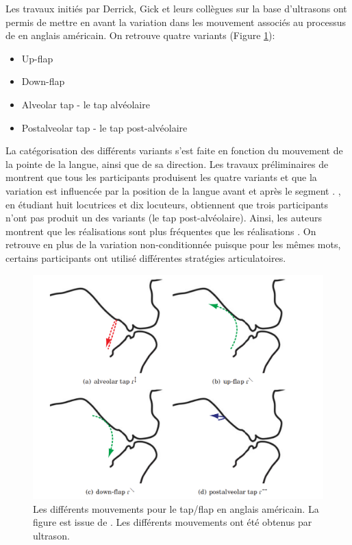 Les travaux initiés par Derrick, Gick et leurs collègues \parencite{derrickQuantitativeAnalysisSubphonemic2008,derrickTwoPhonologicalSegments2010,derrickIndividualVariationEnglish2011,derrickAcousticCorrelatesFlaps2013} sur la base d'ultrasons ont permis de mettre en avant la variation dans les mouvement associés au processus de  en anglais américain. On retrouve quatre variants (Figure \ref{fig:tapflap}):

\begin{itemize}
	\item Up-flap
	\item Down-flap
	\item Alveolar tap - le tap alvéolaire
	\item Postalveolar tap - le tap post-alvéolaire
\end{itemize} 

La catégorisation des différents variants s'est faite en fonction du mouvement de la pointe de la langue, ainsi que de sa direction. Les travaux préliminaires de \textcite{derrickQuantitativeAnalysisSubphonemic2008} montrent que tous les participants produisent les quatre variants et que la variation est influencée par la position de la langue avant et après le segment \parencite{derrickTwoPhonologicalSegments2010}. \textcite{derrickIndividualVariationEnglish2011}, en étudiant huit locutrices et dix locuteurs, obtiennent que trois participants n'ont pas produit un des variants (le tap post-alvéolaire). Ainsi, les auteurs montrent que les réalisations  sont plus fréquentes que les réalisations . On retrouve en plus de la variation non-conditionnée puisque pour les mêmes mots, certains participants ont utilisé différentes stratégies articulatoires. \\

\begin{figure}
	\centering
	\includegraphics[width=0.7\linewidth]{rhotiques/images/tap_flap}
	\caption[Différents mouvements pour le tap/flap en anglais américain. Figure issue de \textcite{derrickAcousticCorrelatesFlaps2013}]{Les différents mouvements pour le tap/flap en anglais américain. La figure est issue de \textcite{derrickAcousticCorrelatesFlaps2013}. Les différents mouvements ont été obtenus par ultrason.}
	\label{fig:tapflap}
\end{figure}

